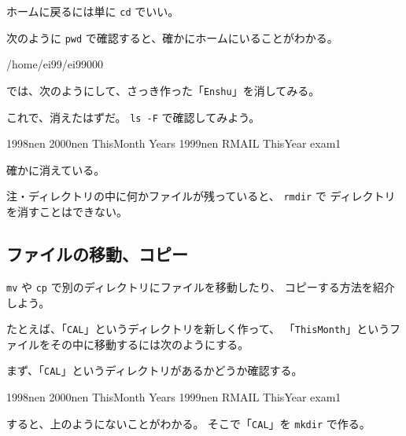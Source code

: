ホームに戻るには単に \texttt{cd} でいい。

\begin{progls}
%
\end{progls}

次のように \texttt{pwd} で確認すると、確かにホームにいることがわかる。

\begin{progls}
/home/ei99/ei99000
%
\end{progls}

では、次のようにして、さっき作った「\texttt{Enshu}」を消してみる。

\begin{progls}
%
\end{progls}

これで、消えたはずだ。
\texttt{ls -F} で確認してみよう。

\begin{progls}
1998nen         2000nen         ThisMonth       Years
1999nen         RMAIL           ThisYear        exam1
%
\end{progls}

確かに消えている。

\bigskip

注・ディレクトリの中に何かファイルが残っていると、 \texttt{rmdir} で
ディレクトリを消すことはできない。

\subsection{ファイルの移動、コピー}

\texttt{mv} や \texttt{cp} で別のディレクトリにファイルを移動したり、
コピーする方法を紹介しよう。

たとえば、「\texttt{CAL}」というディレクトリを新しく作って、
「\texttt{ThisMonth}」というファイルをその中に移動するには次のようにする。

まず、「\texttt{CAL}」というディレクトリがあるかどうか確認する。

\begin{progls}
1998nen         2000nen         ThisMonth       Years
1999nen         RMAIL           ThisYear        exam1
%
\end{progls}

すると、上のようにないことがわかる。
そこで「\texttt{CAL}」を \texttt{mkdir} で作る。

\begin{progls}
%
\end{progls}

